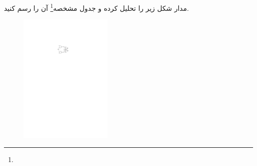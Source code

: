 


مدار شکل زیر را تحلیل کرده و جدول مشخصه\footnote{} آن را رسم کنید.



\begin{figure}[h]
	\centering
	\includegraphics[width=0.4\textwidth]{fig/Q_opt1.pdf}
	\label{fig:Q_opt_1}
\end{figure}
